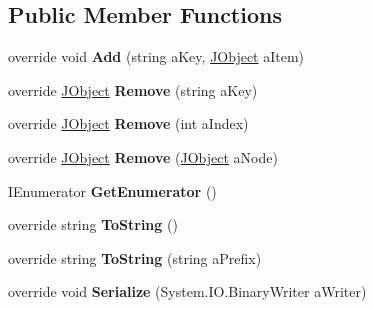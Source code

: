 \subsection*{Public Member Functions}
\begin{DoxyCompactItemize}
\item 
\hypertarget{class_simple_j_s_o_n_1_1_j_s_o_n_class_a00c5767efd02eb45a9c28cca783968bd}{override void {\bfseries Add} (string a\+Key, \hyperlink{class_simple_j_s_o_n_1_1_j_object}{J\+Object} a\+Item)}\label{class_simple_j_s_o_n_1_1_j_s_o_n_class_a00c5767efd02eb45a9c28cca783968bd}

\item 
\hypertarget{class_simple_j_s_o_n_1_1_j_s_o_n_class_a0ed64825c6b1e2d15287b0c7b8a1e14f}{override \hyperlink{class_simple_j_s_o_n_1_1_j_object}{J\+Object} {\bfseries Remove} (string a\+Key)}\label{class_simple_j_s_o_n_1_1_j_s_o_n_class_a0ed64825c6b1e2d15287b0c7b8a1e14f}

\item 
\hypertarget{class_simple_j_s_o_n_1_1_j_s_o_n_class_a57013311522930363eba5d118ab5211c}{override \hyperlink{class_simple_j_s_o_n_1_1_j_object}{J\+Object} {\bfseries Remove} (int a\+Index)}\label{class_simple_j_s_o_n_1_1_j_s_o_n_class_a57013311522930363eba5d118ab5211c}

\item 
\hypertarget{class_simple_j_s_o_n_1_1_j_s_o_n_class_a2f604ccee20d899cf0ce0ddf908095b3}{override \hyperlink{class_simple_j_s_o_n_1_1_j_object}{J\+Object} {\bfseries Remove} (\hyperlink{class_simple_j_s_o_n_1_1_j_object}{J\+Object} a\+Node)}\label{class_simple_j_s_o_n_1_1_j_s_o_n_class_a2f604ccee20d899cf0ce0ddf908095b3}

\item 
\hypertarget{class_simple_j_s_o_n_1_1_j_s_o_n_class_a68426db5b991a4d234578b239517e7a6}{I\+Enumerator {\bfseries Get\+Enumerator} ()}\label{class_simple_j_s_o_n_1_1_j_s_o_n_class_a68426db5b991a4d234578b239517e7a6}

\item 
\hypertarget{class_simple_j_s_o_n_1_1_j_s_o_n_class_a7e79e6ce1bb70b8eea59055a912c7cd7}{override string {\bfseries To\+String} ()}\label{class_simple_j_s_o_n_1_1_j_s_o_n_class_a7e79e6ce1bb70b8eea59055a912c7cd7}

\item 
\hypertarget{class_simple_j_s_o_n_1_1_j_s_o_n_class_ae729e88465d796f3b408b54edca7f22f}{override string {\bfseries To\+String} (string a\+Prefix)}\label{class_simple_j_s_o_n_1_1_j_s_o_n_class_ae729e88465d796f3b408b54edca7f22f}

\item 
\hypertarget{class_simple_j_s_o_n_1_1_j_s_o_n_class_ae72d669667b7ff3f48a4f9653d7687cb}{override void {\bfseries Serialize} (System.\+I\+O.\+Binary\+Writer a\+Writer)}\label{class_simple_j_s_o_n_1_1_j_s_o_n_class_ae72d669667b7ff3f48a4f9653d7687cb}

\end{DoxyCompactItemize}
